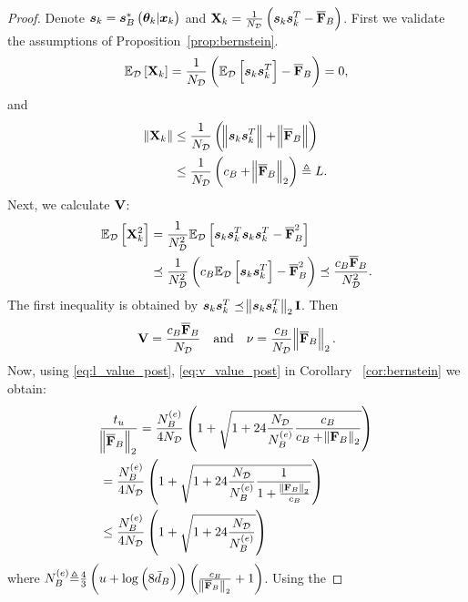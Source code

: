 \begin{proof}
Denote $\bm{s}_k=\bm{s}_{B}^*\left(\bm{\theta}_k|\bm{x}_k\right)$ {and} $\mathbf{X}_k=\frac{1}{N_{\mathcal{D}}}\left(\bm{s}_k\bm{s}_k^T-\overline{\mathbf{F}}_{B}\right)$. 
 First we validate the assumptions of Proposition~\ref{prop:bernstein}.
    \begin{align*}
        \mathbb{E}_{\mathcal{D}}\left[\mathbf{X}_k\right]=\frac{1}{N_{\mathcal{D}}}\left(\mathbb{E}_{\mathcal{D}}\left[\bm{s}_k\bm{s}_k^T\right]-\overline{\mathbf{F}}_{B}\right)=0,
    \end{align*}
    and 
    \begin{align}\label{eq:l_value_post}
        \norm{\mathbf{X}_k}&\leq\frac{1}{N_{\mathcal{D}}}\left(\norm{\bm{s}_k\bm{s}_k^T}+\norm{\overline{\mathbf{F}}_{B}}\right)\nonumber\\
        &\leq \frac{1}{N_{\mathcal{D}}}\left(c_B+\norm{\overline{\mathbf{F}}_{B}}_2\right) \triangleq L.
    \end{align}
    Next, we calculate $\mathbf{V}$:
    \begin{align*}
        \mathbb{E}_{\mathcal{D}}\left[\mathbf{X}_k^2\right]&=\frac{1}{N_{\mathcal{D}}^2}\mathbb{E}_{\mathcal{D}}\left[{\bm{s}_k\bm{s}_k^T}\bm{s}_k\bm{s}_k^T -\overline{\mathbf{F}}_{B}^2\right]\\
        &\preceq \frac{1}{N_{\mathcal{D}}^2}\left(c_B\mathbb{E}_{\mathcal{D}}\left[\bm{s}_k\bm{s}_k^T\right] -\overline{\mathbf{F}}_{B}^2\right)\preceq  \frac{c_B\overline{\mathbf{F}}_{B}}{N_{\mathcal{D}}^2}.
    \end{align*}
    {The first inequality is obtained by $\bm{s}_k\bm{s}_k^T\preceq \norm{\bm{s}_k\bm{s}_k^T}_2\mathbf{I}$}.
    Then
    \begin{equation}\label{eq:v_value_post}
    \mathbf{V}=\frac{c_B \overline{\mathbf{F}}_{B}}{N_{\mathcal{D}}} \quad\mathrm{and} \quad \nu=\frac{c_B}{N_{\mathcal{D}}}\norm{\overline{\mathbf{F}}_{B}}_2.
    \end{equation}
           {Now, using} \eqref{eq:l_value_post}, \eqref{eq:v_value_post} in Corollary ~\ref{cor:bernstein} we obtain:
            \begin{align}
              &\frac{t_u}{\norm{\overline{\mathbf{F}}_{B}}_2}=\frac{N_B^{(e)}}{4N_{\mathcal{D}}}\left(1+\sqrt{1+24\frac{N_{\mathcal{D}}}{N_B^{(e)}}\frac{c_B}{c_B+\norm{\mathbf{F}_{B}}_2}}\right)\nonumber\\
              &=\frac{N_B^{(e)}}{4N_{\mathcal{D}}}\left(1+\sqrt{1+24\frac{N_{\mathcal{D}}}{N_B^{(e)}}\frac{1}{1+\frac{\norm{\mathbf{F}_{B}}_2}{c_B}}}\right)\nonumber\\
              &\leq \frac{N_B^{(e)}}{4N_{\mathcal{D}}}\left(1+\sqrt{1+24\frac{N_{\mathcal{D}}}{N_B^{(e)}}}\right) \label{eq:tBe_bound}
            \end{align}
            where $N_B^{(e)} {\triangleq}\frac{4}{3}\left(u+\log\left(8{\bar{d}_B}\right)\right)\left(\frac{c_B}{\norm{\overline{\mathbf{F}}_{B}}_2}+1\right)$. Using the 

\end{proof}
